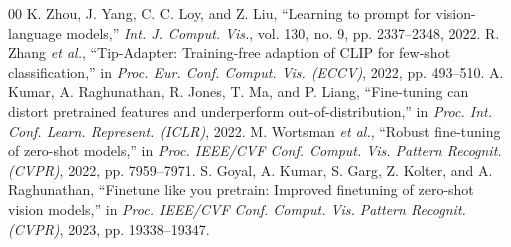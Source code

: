 \documentclass[conference]{IEEEtran}
\begin{document}
\begin{thebibliography}{00}
 K. Zhou, J. Yang, C. C. Loy, and Z. Liu, ``Learning to prompt for vision-language models,'' \textit{Int. J. Comput. Vis.}, vol. 130, no. 9, pp. 2337--2348, 2022.
 R. Zhang \textit{et al.}, ``Tip-Adapter: Training-free adaption of CLIP for few-shot classification,'' in \textit{Proc. Eur. Conf. Comput. Vis. (ECCV)}, 2022, pp. 493--510.
 A. Kumar, A. Raghunathan, R. Jones, T. Ma, and P. Liang, ``Fine-tuning can distort pretrained features and underperform out-of-distribution,'' in \textit{Proc. Int. Conf. Learn. Represent. (ICLR)}, 2022.
 M. Wortsman \textit{et al.}, ``Robust fine-tuning of zero-shot models,'' in \textit{Proc. IEEE/CVF Conf. Comput. Vis. Pattern Recognit. (CVPR)}, 2022, pp. 7959--7971.
 S. Goyal, A. Kumar, S. Garg, Z. Kolter, and A. Raghunathan, ``Finetune like you pretrain: Improved finetuning of zero-shot vision models,'' in \textit{Proc. IEEE/CVF Conf. Comput. Vis. Pattern Recognit. (CVPR)}, 2023, pp. 19338--19347.
\end{thebibliography}
\end{document}
